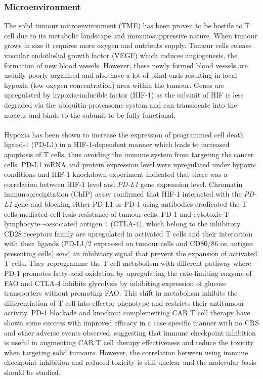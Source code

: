 \documentclass[12pt,oneside]{report}
\begin{document}
\subsubsection{Microenvironment} 
The solid tumour microenvironment (TME) has been proven to be hostile to T cell due to its metabolic landscape and immunosuppressive nature. When tumour grows in size it requires more oxygen and nutrients supply. Tumour cells release vascular endothelial growth factor (VEGF) which induces angiogenesis, the formation of new blood vessels\citep{VEGF}. However, these newly formed blood vessels are usually poorly organised and also have a lot of blind ends resulting in local hypoxia (low oxygen concentration) area within the tumour\citep{hypoxia}. Genes are upregulated by hypoxia-inducible factor (HIF-1) as the \textalpha{} subunit of HIF is less degraded via the ubiquitin-proteasome system and can translocate into the nucleus and binds to the \textbeta{} subunit to be fully functional.
\\\\Hypoxia has been shown to increase the expression of programmed cell death ligand-1 (PD-L1) in a HIF-1\textalpha -dependent manner which leads to increased apoptosis of T cells, thus avoiding the immune system from targeting the cancer cells\citep{hypoxia-9}. PD-L1 mRNA and protein expression level were upregulated under hypoxic conditions and HIF-1\textalpha{} knockdown experiment indicated that there was a correlation between HIF-1\textalpha{} level and \textit{PD-L1} gene expression level\citep{hypoxia-9}. Chromatin immunoprecipitation (ChIP) assay confirmed that HIF-1\textalpha{} interacted with the \textit{PD-L1} gene and blocking either PD-L1 or PD-1 using antibodies eradicated the T cells-mediated cell lysis resistance of tumour cells\citep{hypoxia-9}. PD-1 and cytotoxic T-lymphocyte–-associated antigen 4 (CTLA-4), which belong to the inhibitory CD28 receptors family are upregulated in activated T cells and their interaction with their ligands (PD-L1/2 expressed on tumour cells and CD80/86 on antigen presenting cells) send an inhibitory signal that prevent the expansion of activated T cells\cite{PD-1}. They reprogramme the T cell metabolism with different pathway where PD-1 promotes fatty-acid oxidation by upregulating the rate-limiting enzyme of FAO and CTLA-4 inhibits glycolysis by inhibiting expression of glucose transporters without promoting FAO\cite{PD-1}. This shift in metabolism inhibits the differentiation of T cell into effector phenotype and restricts their antitumour activity. PD-1 blockade\citep{block} and knockout\citep{knockout} complementing CAR T cell therapy have shown some success with improved efficacy in a case specific manner with no CRS and other adverse events observed, suggesting that immune checkpoint inhibition is useful in augmenting CAR T cell therapy effectiveness and reduce the toxicity when targeting solid tumours. However, the correlation between using immune checkpoint inhibition and reduced toxicity is still unclear and the molecular basis should be studied.
\end{document}
